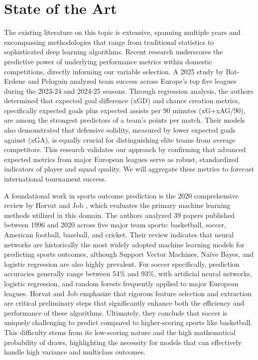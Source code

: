 \documentclass[11pt]{article}
\begin{document}
\section{State of the Art}

The existing literature on this topic is extensive, spanning multiple years and encompassing methodologies that range from traditional statistics to sophisticated deep learning algorithms. Recent research underscores the predictive power of underlying performance metrics within domestic competitions, directly informing our variable selection. A 2025 study by Bat-Erdene and Peloguin \cite{2025europeData} analyzed team success across Europe's top five leagues during the 2023-24 and 2024-25 seasons. Through regression analysis, the authors determined that expected goal difference (xGD) and chance creation metrics, specifically expected goals plus expected assists per 90 minutes (xG+xAG/90), are among the strongest predictors of a team's points per match. Their models also demonstrated that defensive solidity, measured by lower expected goals against (xGA), is equally crucial for distinguishing elite teams from average competitors. This research validates our approach by confirming that advanced expected metrics from major European leagues serve as robust, standardized indicators of player and squad quality. We will aggregate these metrics to forecast international tournament success.

A foundational work in sports outcome prediction is the 2020 comprehensive review by Horvat and Job \cite{2020mlreview}, which evaluates the primary machine learning methods utilized in this domain. The authors analyzed 39 papers published between 1996 and 2020 across five major team sports: basketball, soccer, American football, baseball, and cricket. Their review indicates that neural networks are historically the most widely adopted machine learning models for predicting sports outcomes, although Support Vector Machines, Naïve Bayes, and logistic regression are also highly prevalent. For soccer specifically, prediction accuracies generally range between 54\% and 93\%, with artificial neural networks, logistic regression, and random forests frequently applied to major European leagues. Horvat and Job emphasize that rigorous feature selection and extraction are critical preliminary steps that significantly enhance both the efficiency and performance of these algorithms. Ultimately, they conclude that soccer is uniquely challenging to predict compared to higher-scoring sports like basketball. This difficulty stems from its low-scoring nature and the high mathematical probability of draws, highlighting the necessity for models that can effectively handle high variance and multiclass outcomes.
\end{document}
